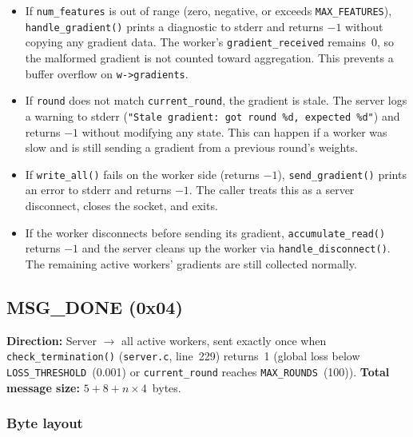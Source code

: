 \documentclass[11pt]{article}
\begin{document}
\begin{itemize}
  \item If \texttt{num\_features} is out of range (zero, negative, or exceeds
    \texttt{MAX\_FEATURES}), \texttt{handle\_gradient()} prints a diagnostic to
    stderr and returns $-1$ without copying any gradient data. The worker's
    \texttt{gradient\_received} remains~0, so the malformed gradient is not
    counted toward aggregation. This prevents a buffer overflow on
    \texttt{w->gradients}.
  \item If \texttt{round} does not match \texttt{current\_round}, the gradient
    is stale. The server logs a warning to stderr
    (\texttt{"Stale gradient: got round \%d, expected \%d"}) and returns $-1$
    without modifying any state. This can happen if a worker was slow and is
    still sending a gradient from a previous round's weights.
  \item If \texttt{write\_all()} fails on the worker side (returns $-1$),
    \texttt{send\_gradient()} prints an error to stderr and returns $-1$. The
    caller treats this as a server disconnect, closes the socket, and exits.
  \item If the worker disconnects before sending its gradient,
    \texttt{accumulate\_read()} returns $-1$ and the server cleans up the worker
    via \texttt{handle\_disconnect()}. The remaining active workers' gradients
    are still collected normally.
\end{itemize}

\subsection{MSG\_DONE (0x04)}

\textbf{Direction:} Server $\to$ all active workers, sent exactly once when
\texttt{check\_termination()} (\texttt{server.c}, line~229) returns~1
(global loss below \texttt{LOSS\_THRESHOLD}~(0.001) or \texttt{current\_round}
reaches \texttt{MAX\_ROUNDS}~(100)).
\textbf{Total message size:} $5 + 8 + n \times 4$~bytes.

\subsubsection*{Byte layout}
\end{document}
